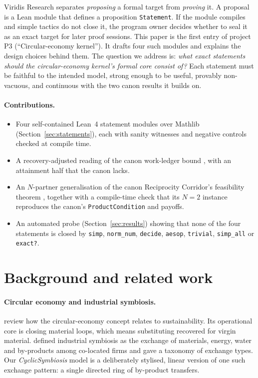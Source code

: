 \documentclass[11pt]{article}
\theoremstyle{remark}
\begin{document}
Viridis Research separates \emph{proposing} a formal target from \emph{proving} it. A proposal
is a Lean module that defines a proposition \texttt{Statement}. If the module compiles and simple
tactics do not close it, the program owner decides whether to seal it as an exact target for
later proof sessions. This paper is the first entry of project P3 (``Circular-economy kernel'').
It drafts four such modules and explains the design choices behind them. The question we address
is: \emph{what exact statements should the circular-economy kernel's formal core consist of?}
Each statement must be faithful to the intended model, strong enough to be useful, provably
non-vacuous, and continuous with the two canon results it builds on.

\paragraph{Contributions.}
\begin{itemize}
\item Four self-contained Lean~4 statement modules over Mathlib
\citep{moura2021lean4,mathlib2020} (Section~\ref{sec:statements}), each with sanity witnesses and
negative controls checked at compile time.
\item A recovery-adjusted reading of the canon work-ledger bound \citep{hart2026udwl}, with an
attainment half that the canon lacks.
\item An $N$-partner generalisation of the canon Reciprocity Corridor's feasibility theorem
\citep{hart2026reciprocity}, together with a compile-time check that its $N=2$ instance reproduces
the canon's \texttt{ProductCondition} and payoffs.
\item An automated probe (Section~\ref{sec:results}) showing that none of the four statements is
closed by \texttt{simp}, \texttt{norm\_num}, \texttt{decide}, \texttt{aesop}, \texttt{trivial},
\texttt{simp\_all} or \texttt{exact?}.
\end{itemize}

\section{Background and related work}
\paragraph{Circular economy and industrial symbiosis.}
\citet{geissdoerfer2017} review how the circular-economy concept relates to sustainability. Its
operational core is closing material loops, which means substituting recovered for virgin
material. \citet{chertow2000} defined industrial symbiosis as the exchange of materials, energy,
water and by-products among co-located firms and gave a taxonomy of exchange types. Our
\emph{CyclicSymbiosis} model is a deliberately stylised, linear version of one such exchange
pattern: a single directed ring of by-product transfers.
\end{document}
